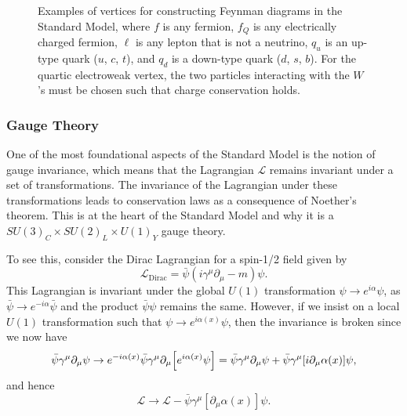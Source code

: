\begin{figure}[htbp]
  \centering
  
  \caption{
    Examples of vertices for constructing Feynman diagrams in the Standard Model, where $f$ is any fermion, $f_Q$ is any electrically charged fermion, $\ell$ is any lepton that is not a neutrino, $q_u$ is an up-type quark ($u$, $c$, $t$), and $q_d$ is a down-type quark ($d$, $s$, $b$).
    For the quartic electroweak vertex, the two particles interacting with the $W$'s must be chosen such that charge conservation holds.
  }
  \label{fig:SMVert}
\end{figure}

\subsubsection{Gauge Theory}

One of the most foundational aspects of the Standard Model is the notion of gauge invariance, which means that the Lagrangian $\mathcal{L}$ remains invariant under a set of transformations.
The invariance of the Lagrangian under these transformations leads to conservation laws as a consequence of Noether's theorem.
This is at the heart of the Standard Model and why it is a $SU(3)_C\times SU(2)_L\times U(1)_Y$ gauge theory.

To see this, consider the Dirac Lagrangian for a spin-1/2 field given by
\begin{equation}
  \mathcal{L}_\mathrm{Dirac}=\bar{\psi}(i\gamma^\mu\partial_\mu-m)\psi.
\end{equation}
This Lagrangian is invariant under the global $U(1)$ transformation $\psi\to e^{i\alpha}\psi$, as $\bar{\psi}\to e^{-i\alpha}\bar{\psi}$ and the product $\bar{\psi}\psi$ remains the same.
However, if we insist on a local $U(1)$ transformation such that $\psi\to e^{i\alpha(x)}\psi$, then the invariance is broken since we now have
\begin{equation}
  \bar{\psi}\gamma^\mu\partial_\mu\psi\to e^{-i\alpha(x)}\bar{\psi}\gamma^\mu\partial_\mu\bqty{e^{i\alpha(x)}\psi}=\bar{\psi}\gamma^\mu\partial_\mu\psi+\bar{\psi}\gamma^\mu[i\partial_\mu\alpha(x)]\psi,
\end{equation}
and hence
\begin{equation}
  \mathcal{L}\to\mathcal{L}-\bar{\psi}\gamma^\mu[\partial_\mu\alpha(x)]\psi.
\end{equation}

